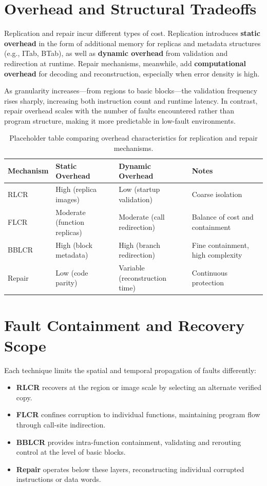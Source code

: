 \section*{Overhead and Structural Tradeoffs}
Replication and repair incur different types of cost.  
Replication introduces \textbf{static overhead} in the form of additional memory
for replicas and metadata structures (e.g., ITab, BTab), as well as
\textbf{dynamic overhead} from validation and redirection at runtime.
Repair mechanisms, meanwhile, add \textbf{computational overhead} for decoding
and reconstruction, especially when error density is high.

As granularity increases—from regions to basic blocks—the validation frequency
rises sharply, increasing both instruction count and runtime latency.
In contrast, repair overhead scales with the number of faults encountered rather
than program structure, making it more predictable in low-fault environments.

\begin{table}[h!]
  \centering
  \renewcommand{\arraystretch}{1.2}
  \begin{tabularx}{\linewidth}{|l|X|X|X|}
    \hline
    \textbf{Mechanism} & \textbf{Static Overhead} & \textbf{Dynamic Overhead} & \textbf{Notes} \\ \hline
    RLCR  & High (replica images) & Low (startup validation) & Coarse isolation \\ \hline
    FLCR  & Moderate (function replicas) & Moderate (call redirection) & Balance of cost and containment \\ \hline
    BBLCR & High (block metadata) & High (branch redirection) & Fine containment, high complexity \\ \hline
    Repair & Low (code parity) & Variable (reconstruction time) & Continuous protection \\ \hline
  \end{tabularx}
  \caption{Placeholder table comparing overhead characteristics for replication and repair mechanisms.}
  \label{tab:limit-overhead}
\end{table}

\section*{Fault Containment and Recovery Scope}
Each technique limits the spatial and temporal propagation of faults differently:
\begin{itemize}
  \item \textbf{RLCR} recovers at the region or image scale by selecting an alternate verified copy.
  \item \textbf{FLCR} confines corruption to individual functions, maintaining program flow through call-site indirection.
  \item \textbf{BBLCR} provides intra-function containment, validating and rerouting control at the level of basic blocks.
  \item \textbf{Repair} operates below these layers, reconstructing individual corrupted instructions or data words.
\end{itemize}

